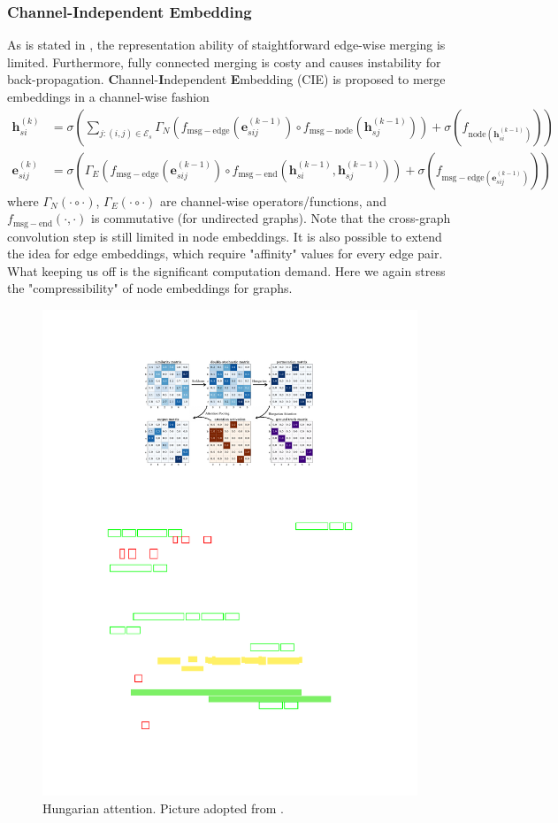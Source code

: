 \documentclass[a4paper]{article}
\begin{document}
\subsubsection{Channel-Independent Embedding}
As is stated in \cite{cie}, the representation ability of staightforward edge-wise merging is limited. Furthermore, fully connected merging is costy and causes instability for back-propagation. \textbf{C}hannel-\textbf{I}ndependent \textbf{E}mbedding (CIE) is proposed to merge embeddings in a channel-wise fashion
\begin{align}
    \mathbf{h}_{si}^{(k)} &= \sigma\left(\sum_{j:(i,j)\in \mathcal{E}_s} \Gamma_N \left(f_{\mathrm{msg-edge}}\left(\mathbf{e}_{sij}^{(k-1)}\right)  \circ f_{\mathrm{msg-node}}\left(\mathbf{h}_{sj}^{(k-1)}\right) \right) + \sigma\left(f_{\mathrm{node}\left(\mathbf{h}_{si}^{(k-1)}\right)}\right) \right)   \\
    \mathbf{e}_{sij}^{(k)} &= \sigma\left(\Gamma_E \left(f_{\mathrm{msg-edge}}\left(\mathbf{e}_{sij}^{(k-1)}\right)  \circ f_{\mathrm{msg-end}}\left(\mathbf{h}_{si}^{(k-1)}, \mathbf{h}_{sj}^{(k-1)}\right) \right) + \sigma\left(f_{\mathrm{msg-edge}\left(\mathbf{e}_{sij}^{(k-1)}\right)}\right) \right)  
\end{align}
where $\Gamma_N \left(\cdot \circ \cdot\right)$, $\Gamma_E \left(\cdot \circ \cdot\right)$ are channel-wise operators/functions, and $f_{\mathrm{msg-end}}(\cdot, \cdot)$ is commutative (for undirected graphs). Note that the cross-graph convolution step is still limited in node embeddings. It is also possible to extend the idea for edge embeddings, which require "affinity" values for every edge pair. What keeping us off is the significant computation demand. Here we again stress the "compressibility" of node embeddings for graphs.


\begin{figure}[htbp]
    \centering
    \includegraphics[width=0.5\linewidth]{Images/hungarian.pdf}
    \caption{Hungarian attention. Picture adopted from \cite{cie}.}
\end{figure}
\end{document}
